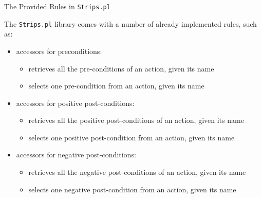 \documentclass[presentation]{beamer}\mode<presentation>{\usetheme{AMSBolognaFC}}
\begin{document}
\begin{frame}[c]{The Provided Rules in \texttt{Strips.pl}}

	The \texttt{Strips.pl} library comes with a number of already implemented rules, such as:
	\begin{itemize}
		\item accessors for preconditions:
		\begin{itemize}
			\item {} retrieves all the pre-conditions of an action, given its name
			\item {} selects one pre-condition from an action, given its name
		\end{itemize}

		\item accessors for positive post-conditions:
		\begin{itemize}
			\item {} retrieves all the positive post-conditions of an action, given its name
			\item {} selects one positive post-condition from an action, given its name
		\end{itemize}

		\item accessors for negative post-conditions:
		\begin{itemize}
			\item {} retrieves all the negative post-conditions of an action, given its name
			\item {} selects one negative post-condition from an action, given its name
		\end{itemize}
	\end{itemize}
\end{frame}
\end{document}
